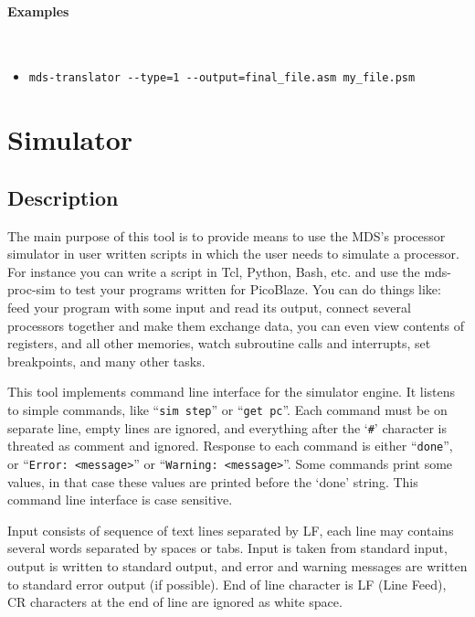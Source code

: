     \paragraph{Examples}~\\
        \begin{itemize}
            \item \verb'mds-translator --type=1 --output=final_file.asm my_file.psm'\\
        \end{itemize}

\clearpage
\section{Simulator}
    \subsection{Description}
        The main purpose of this tool is to provide means to use the MDS's processor simulator in user written scripts in which the user needs to simulate a processor. For instance you can write a script in Tcl, Python, Bash, etc. and use the mds-proc-sim to test your programs written for PicoBlaze. You can do things like: feed your program with some input and read its output, connect several processors together and make them exchange data, you can even view contents of registers, and all other memories, watch subroutine calls and interrupts, set breakpoints, and many other tasks.

        This tool implements command line interface for the simulator engine. It listens to simple commands, like ``\texttt{sim~step}'' or ``\texttt{get~pc}''. Each command must be on separate line, empty lines are ignored, and everything after the `\texttt{\#}' character is threated as comment and ignored. Response to each command is either ``\texttt{done}'', or ``\texttt{Error: <message>}'' or ``\texttt{Warning: <message>}''. Some commands print some values, in that case these values are printed before the `done' string. This command line interface is case sensitive.

        Input consists of sequence of text lines separated by LF, each line may contains several words separated by spaces or tabs. Input is taken from standard input, output is written to standard output, and error and warning messages are written to standard error output (if possible). End of line character is LF (Line Feed), CR characters at the end of line are ignored as white space.

